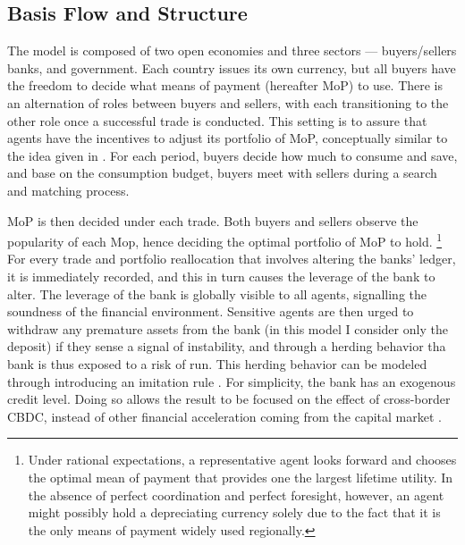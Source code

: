 \subsection{Basis Flow and Structure}

The model is composed of two open economies and three sectors --- buyers/sellers
banks, and government. Each country issues its own currency, but all buyers have
the freedom to decide what means of payment (hereafter MoP) to use.  There is
an alternation of roles between buyers and sellers, with each transitioning to
the other role once a successful trade is conducted. This setting is to assure
that agents have the incentives to adjust its portfolio of MoP, conceptually
similar to the idea given in \citet*{TW95}. For each period, buyers decide how
much to consume and save, and base on the consumption budget, buyers meet with
sellers during a search and matching process. 

MoP is then decided under each trade. Both buyers and sellers observe the
popularity of each Mop, hence deciding the optimal portfolio of MoP to hold.
\footnote{Under rational expectations, a representative agent looks forward and
chooses the optimal mean of payment that provides one the largest lifetime
utility. In the absence of perfect coordination and perfect foresight, however,
an agent might possibly hold a depreciating currency solely due to the fact that
it is the only means of payment widely used regionally.}
For every trade and portfolio reallocation that involves altering the banks'
ledger, it is immediately recorded, and this in turn causes the leverage of the
bank to alter. The leverage of the bank is globally visible to all agents,
signalling the soundness of the financial environment. Sensitive agents are then
urged to withdraw any premature assets from the bank (in this model I consider
only the deposit) if they sense a signal of instability, and through a herding
behavior tha bank is thus exposed to a risk of run. This herding behavior can be
modeled through introducing an imitation rule \citep*{Santos2021}. For
simplicity, the bank has an exogenous credit level. Doing so allows the result
to be focused on the effect of cross-border CBDC, instead of other financial
acceleration coming from the capital market \citep{BGG96}.  




